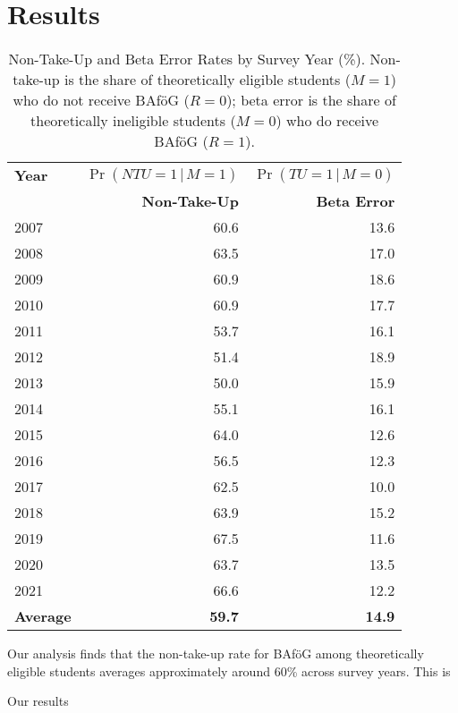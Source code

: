 \section{Results}

\begin{table}[htbp]
\centering
\begin{tabular}{l@{\hspace{2em}}r@{\hspace{2em}}r}
\toprule
\textbf{Year} & \(\Pr(NTU=1\,|\,M=1)\) & \(\Pr(TU=1\,|\,M=0)\) \\
              & \textbf{Non-Take-Up} & \textbf{Beta Error} \\
\midrule
2007 & 60.6 & 13.6 \\
2008 & 63.5 & 17.0 \\
2009 & 60.9 & 18.6 \\
2010 & 60.9 & 17.7 \\
2011 & 53.7 & 16.1 \\
2012 & 51.4 & 18.9 \\
2013 & 50.0 & 15.9 \\
2014 & 55.1 & 16.1 \\
2015 & 64.0 & 12.6 \\
2016 & 56.5 & 12.3 \\
2017 & 62.5 & 10.0 \\
2018 & 63.9 & 15.2 \\
2019 & 67.5 & 11.6 \\
2020 & 63.7 & 13.5 \\
2021 & 66.6 & 12.2 \\
\midrule
\textbf{Average} & \textbf{59.7} & \textbf{14.9} \\
\bottomrule
\end{tabular}
\caption{Non-Take-Up and Beta Error Rates by Survey Year (\%). Non-take-up is the share of theoretically eligible students (\(M=1\)) who do not receive BAföG (\(R=0\)); beta error is the share of theoretically ineligible students (\(M=0\)) who do receive BAföG (\(R=1\)).}
\end{table}


Our analysis finds that the non-take-up rate for BAföG among theoretically eligible students averages approximately around 60\% across survey years. This is 

Our results 




% 


